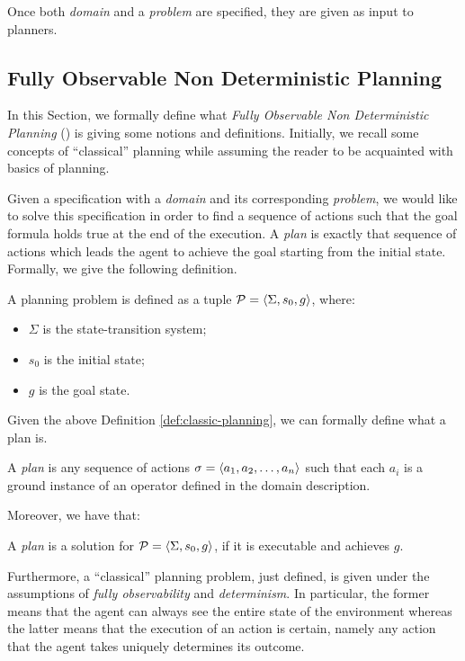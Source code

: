 Once both \PDDL \textit{domain} and a \textit{problem} are specified, they are given as input to planners.
\subsection{Fully Observable Non Deterministic Planning}\label{sec:fond}
In this Section, we formally define what \textit{Fully Observable Non Deterministic Planning} (\FOND) is giving some notions and definitions. Initially, we recall some concepts of ``classical'' planning while assuming the reader to be acquainted with basics of planning.

Given a \PDDL specification with a \textit{domain} and its corresponding \textit{problem}, we would like to solve this specification in order to find a sequence of actions such that the goal formula holds true at the end of the execution. A \textit{plan} is exactly that sequence of actions which leads the agent to achieve the goal starting from the initial state. Formally, we give the following definition.

\begin{definition}\label{def:classic-planning}
A planning problem is defined as a tuple $\mathcal{P} = \langle \Sigma, s_0, g \rangle$, where:
\begin{itemize}
\item $\Sigma$ is the state-transition system;
\item $s_0$ is the initial state;
\item $g$ is the goal state.
\end{itemize}
\end{definition}

\noindent Given the above Definition \ref{def:classic-planning}, we can formally define what a plan is.

\begin{definition}\label{def:plan}
A \textit{plan} is any sequence of actions $\sigma = \langle a_1,a_2,\dots, a_n \rangle$ such that each $a_i$ is a ground instance of an operator defined in the domain description.
\end{definition}

\noindent Moreover, we have that:

\begin{definition}\label{def:plan-sol}
A \textit{plan} is a solution for $\mathcal{P} = \langle \Sigma, s_0, g \rangle$, if it is executable and achieves $g$.
\end{definition}

Furthermore, a ``classical'' planning problem, just defined, is given under the assumptions of \textit{fully observability} and \textit{determinism}. In particular, the former means that the agent can always see the entire state of the environment whereas the latter means that the execution of an action is certain, namely any action that the agent takes uniquely determines its outcome.

